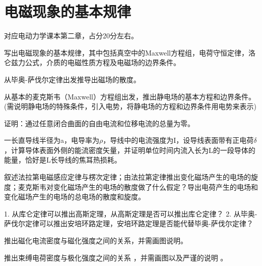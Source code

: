 \section{电磁现象的基本规律}
对应电动力学课本第二章，占分20分左右。

\begin{question}
写出电磁现象的基本规律，其中包括真空中的Maxwell方程组，电荷守恒定律，洛仑兹力公式，介质的电磁性质方程及电磁场的边界条件。
\end{question}

\begin{question} 
从毕奥-萨伐尔定律出发推导出磁场的散度。
\end{question}

\begin{question} 
从基本的麦克斯韦（Maxwell）方程组出发，推出静电场的基本方程和边界条件。
(需说明静电场的特殊条件，引入电势，将静电场的方程和边界条件用电势来表示)
\end{question}

\begin{question} 
证明：通过任意闭合曲面的自由电流和位移电流的总量为零。
\end{question}

\begin{question} 
一长直导线半径为a，电导率为$\rho$，导线中的电流强度为I，设导线表面带有正电荷$\delta$
，计算导体表面外侧的能流密度矢量，并证明单位时间内流入长为L的一段导体的能量，恰好是L长导线的焦耳热损耗。
\end{question}

\begin{question}
叙述法拉第电磁感应定律与楞次定律；由法拉第定律推出变化磁场产生的电场的旋度；麦克斯韦对变化磁场产生的电场的散度做了什么假定？导出电荷产生的电场和变化磁场产生的电场的总电场的散度和旋度。
\end{question}

\begin{question}
1. 从库仑定律可以推出高斯定理，从高斯定理是否可以推出库仑定律？
2. 从毕奥-萨伐尔定律可以推出安培环路定理，安培环路定理是否能代替毕奥-萨伐尔定律？
\end{question}

\begin{question}
推出磁化电流密度与磁化强度之间的关系，并需画图说明。
\end{question}

\begin{question} 
推出束缚电荷密度与极化强度之间的关系 ，并需画图以及严谨的说明 。
\end{question}

